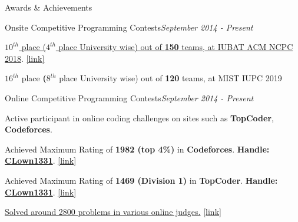 \documentclass{resume}
\begin{document}
\begin{rSection}{Awards \& Achievements} 

\begin{rSubsection}{Onsite Competitive Programming Contests}{\em September 2014 - Present}{}{}{}
\item \href{https://icpc.baylor.edu/ICPCID/DII3NHEO8O8I}{\textbf{$10^{th}$} place (\textbf{$4^{th}$} place University wise) out of \textbf{150} teams, at IUBAT ACM NCPC 2018}. \href{https://icpc.baylor.edu/ICPCID/DII3NHEO8O8I}{[link]}
\item \textbf{$16^{th}$} place \textbf(\textbf{$8^{th}$} place University wise) out of \textbf{120} teams, at MIST IUPC 2019
\end{rSubsection}

\begin{rSubsection}{Online Competitive Programming Contests}{\em September 2014 - Present}{}{}{}
\item Active participant in online coding challenges on sites such as \textbf{TopCoder}, \textbf{Codeforces}.
\item Achieved Maximum Rating of \textbf{1982 (top 4\%)} in \textbf{Codeforces}. \textbf{Handle:} \textbf{\href{http://codeforces.com/profile/CLown1331}{CLown1331}}. \href{http://codeforces.com/profile/CLown1331}{[link]}
\item Achieved Maximum Rating of \textbf{1469 (Division 1)} in \textbf{TopCoder}. \textbf{Handle:} \textbf{\href{https://www.topcoder.com/members/CLown1331/}{CLown1331}}. \href{https://www.topcoder.com/members/CLown1331/}{[link]}
\item \href{https://www.stopstalk.com/user/profile/clown1331}{Solved around 2800 problems in various online judges.} \href{https://www.stopstalk.com/user/profile/clown1331}{[link]}
\end{rSubsection}

\end{rSection}
\end{document}
